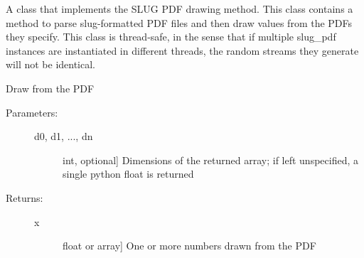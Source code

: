 \documentclass[letterpaper,10pt,english]{sphinxmanual}
\begin{document}

\begin{fulllineitems}
\label{slugpy:slugpy.slug_pdf}
A class that implements the SLUG PDF drawing method. This class
contains a method to parse slug-formatted PDF files and then draw
values from the PDFs they specify. This class is thread-safe, in
the sense that if multiple slug\_pdf instances are instantiated in
different threads, the random streams they generate will not be
identical.

\begin{fulllineitems}
\label{slugpy:slugpy.slug_pdf.draw}
Draw from the PDF
\begin{description}
\item[{Parameters:}] \leavevmode\begin{description}
\item[{d0, d1, ..., dn}] \leavevmode{[}int, optional{]}
Dimensions of the returned array; if left unspecified, a
single python float is returned

\end{description}

\item[{Returns:}] \leavevmode\begin{description}
\item[{x}] \leavevmode{[}float or array{]}
One or more numbers drawn from the PDF

\end{description}

\end{description}

\end{fulllineitems}


\end{fulllineitems}

\end{document}
